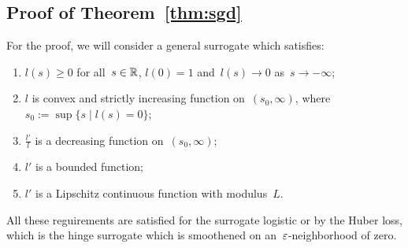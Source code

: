 \subsection{Proof of Theorem~\ref{thm:sgd}}\label{app:sgd2}

For the proof, we will consider a general surrogate which satisfies:
\begin{enumerate}[label={(S\arabic*)}]
  \item \label{surr_basic1} $l(s)\ge 0$ for all~$s\in\mathbb{R}$, $l(0)=1$ and~$l(s)\to 0$ as~$s\to-\infty$;
  \item \label{surr_basic2} $l$ is convex and strictly increasing function on~$(s_0,\infty)$, where~$s_0:=\sup\{s \mid l(s)=0\}$;
  \item \label{surr_ratio} $\frac{l'}{l}$ is a decreasing function on~$(s_0,\infty)$;
  \item \label{surr_der1} $l'$ is a bounded function;
  \item \label{surr_der2} $l'$ is a Lipschitz continuous function with modulus~$L$.
\end{enumerate}
All these reguirements are satisfied for the surrogate logistic or by the Huber loss, which is the hinge surrogate which is smoothened on an~${\varepsilon}$-neighborhood of zero.

